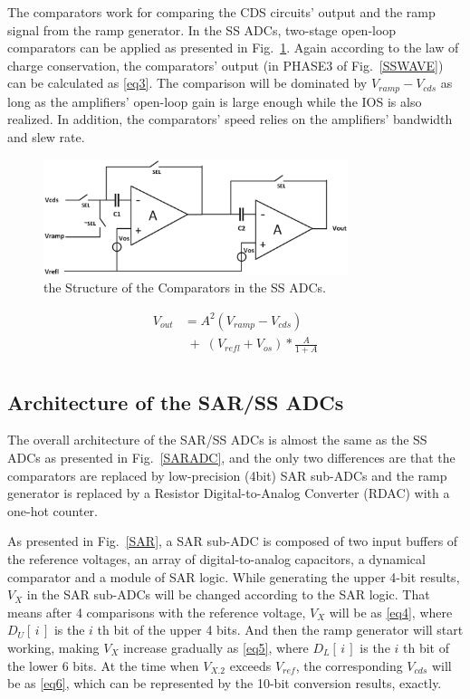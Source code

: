 The comparators work for comparing the CDS circuits' output and the ramp signal from the ramp generator. 
In the SS ADCs, two-stage open-loop comparators can be applied as presented in Fig.~\ref{COM}. Again according to the law of charge conservation, 
the comparators’ output (in PHASE3 of Fig.~\ref{SSWAVE}) can be calculated as \eqref{eq3}. The comparison will be dominated by $V_{ramp}-V_{cds}$ as long as the amplifiers’ open-loop gain 
is large enough while the IOS is also realized. In addition, the comparators’ speed relies on the amplifiers’ bandwidth and slew rate.

\begin{figure}[htbp]
	\centerline{\includegraphics[width=3.5in]{./Figures/COM.eps}}
	\caption{the Structure of the Comparators in the SS ADCs.}
	\label{COM}
\end{figure} 

\begin{equation}
	\begin{aligned}
		V_{out}&=A^2(V_{ramp}-V_{cds})\\
		&\;{+}\;\left(V_{refl}+V_{os}\right)\ast\frac{A}{1+A}\\ 		
		\label{eq3}
	\end{aligned}
\end{equation}

\subsection{Architecture of the SAR/SS ADCs}

The overall architecture of the SAR/SS ADCs is almost the same as the SS ADCs as presented in Fig.~\ref{SARADC}, and the only two differences are that the comparators are replaced by low-precision (4bit) SAR sub-ADCs and
the ramp generator is replaced by a Resistor Digital-to-Analog Converter (RDAC) with a one-hot counter.

As presented in Fig.~\ref{SAR}, a SAR sub-ADC is composed of two input buffers of the reference voltages, an array of digital-to-analog capacitors, a dynamical comparator and a module of SAR logic. While generating the upper 4-bit results, $V_{X}$ in the SAR sub-ADCs will be changed according to the SAR logic. That means after 4 comparisons 
with the reference voltage, $V_{X}$ will be as \eqref{eq4}, where $D_{U}\left[\,i\,\right]$ is the $i$ th bit of the upper 4 bits. 
And then the ramp generator will start working, making $V_{X}$ increase gradually as \eqref{eq5}, where $D_{L}\left[\,i\,\right]$ is the $i$ th bit of the lower 6 bits. 
At the time when $V_{X.2}$ exceeds $V_{ref}$, the corresponding $V_{cds}$ will be as \eqref{eq6}, which can be represented by the 10-bit conversion results, exactly.

